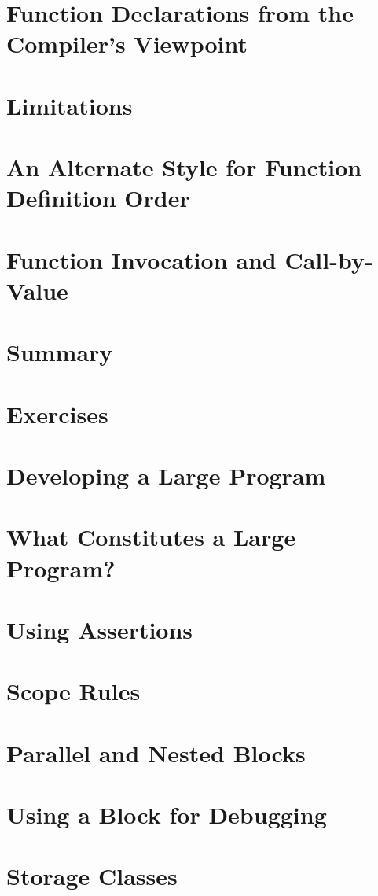 \documentclass{article}
\begin{document}
\section{Function Declarations from the Compiler's Viewpoint}
\section{Limitations}
\section{An Alternate Style for Function Definition Order}
\section{Function Invocation and Call-by-Value}
\section{Summary}
\section{Exercises}

\section{Developing a Large Program}

\section{What Constitutes a Large Program?}
\section{Using Assertions}
\section{Scope Rules}
\section{Parallel and Nested Blocks}
\section{Using a Block for Debugging}
\section{Storage Classes}
\end{document}
